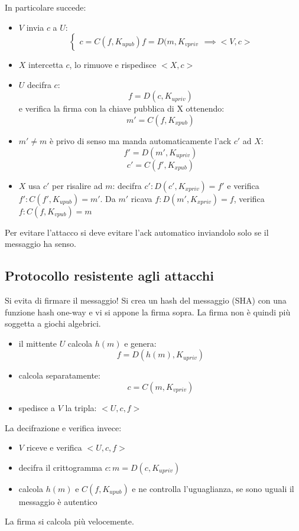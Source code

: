 In particolare succede:
\begin{itemize}
    \item $V$ invia $c$ a $U$:
        \begin{equation}
            \begin{cases}
                c = C(f, K_{upub})
                f = D(m, K_{vpriv}        
            \end{cases}
            \implies <V,c>
        \end{equation}
    \item $X$ intercetta $c$, lo rimuove e rispedisce $<X,c>$
    \item $U$ decifra $c$:
    $$ f = D(c, K_{upriv}) $$
    e verifica la firma con la chiave pubblica di X ottenendo:
    $$ m' = C(f, K_{xpub}) $$
    \item $m' \neq m$ è privo di senso ma manda automaticamente l'ack $c'$ ad $X$:
    $$ f' = D(m', K_{upriv}) $$
    $$ c' = C(f', K_{xpub}) $$
    \item $X$ usa $c'$ per risalire ad $m$: decifra $c': D(c', K_{xpriv}) = f'$ e verifica $f': C(f', K_{upub}) = m'$. Da $m'$ ricava $f: D(m', K_{xpriv})=f$, verifica $f: C(f, K_{vpub}) = m$
\end{itemize}

Per evitare l'attacco si deve evitare l'ack automatico inviandolo solo se il messaggio ha senso.

\subsection{Protocollo resistente agli attacchi}
Si evita di firmare il messaggio!
Si crea un hash del messaggio (SHA) con una funzione hash one-way e vi si appone la firma sopra.
La firma non è quindi più soggetta a giochi algebrici.
\begin{itemize}
    \item il mittente $U$ calcola $h(m)$ e genera:
    $$ f = D(h(m), K_{upriv})$$
    \item calcola separatamente:
    $$ c = C(m, K_{vpriv}) $$
    \item spedisce a $V$ la tripla: $<U, c, f>$
\end{itemize}

La decifrazione e verifica invece:
\begin{itemize}
    \item $V$ riceve e verifica $<U, c, f>$
    \item decifra il crittogramma $c: m = D(c, K_{upriv})$
    \item calcola $h(m)$ e $C(f, K_{upub})$ e ne controlla l'uguaglianza, se sono uguali il messaggio è autentico
\end{itemize}
La firma si calcola più velocemente.

